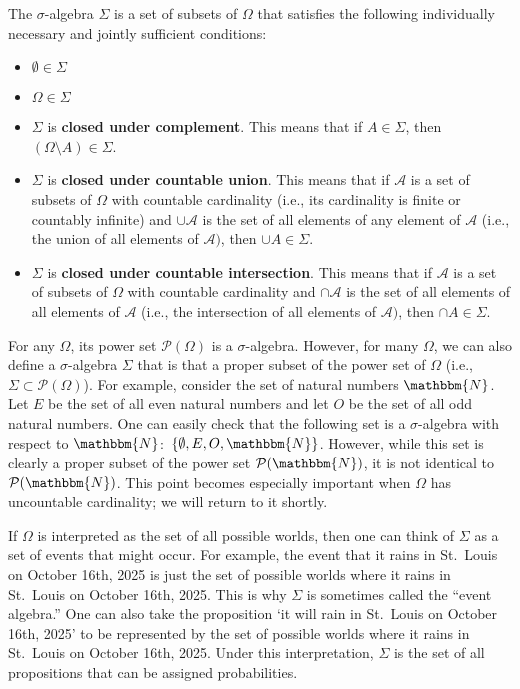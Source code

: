 \documentclass[11pt]{article}
\theoremstyle{definition}
\theoremstyle{remark}
\begin{document}
The $\sigma$-algebra $\Sigma$ is a set of subsets of $\Omega$ that satisfies the following individually necessary and jointly sufficient conditions:
\begin{itemize}
    \item $\emptyset\in\Sigma$

    \item $\Omega\in\Sigma$

    \item $\Sigma$ is \textbf{closed under complement}. This means that if $A\in \Sigma$, then $(\Omega\setminus A)\in \Sigma$.

    \item $\Sigma$ is \textbf{closed under countable union}. This means that if $\mathcal{A}$ is a set of subsets of $\Omega$ with countable cardinality (i.e., its cardinality is finite or countably infinite) and $\cup\mathcal{A}$ is the set of all elements of any element of $\mathcal{A}$ (i.e., the union of all elements of $\mathcal{A})$, then $\cup A\in \Sigma$.

    \item $\Sigma$ is \textbf{closed under countable intersection}. This means that if $\mathcal{A}$ is a set of subsets of $\Omega$ with countable cardinality  and $\cap\mathcal{A}$ is the set of all elements of all elements of $\mathcal{A}$ (i.e., the intersection of all elements of $\mathcal{A})$, then $\cap A\in \Sigma$.
\end{itemize}
For any $\Omega$, its power set $\mathcal{P}(\Omega)$ is a $\sigma$-algebra. However, for many $\Omega$, we can also define a $\sigma$-algebra $\Sigma$ that is that a proper subset of the power set of $\Omega$ (i.e., $\Sigma\subset\mathcal{P}(\Omega)$). For example, consider the set of natural numbers $\mathbbm{N}$. Let $E$ be the set of all even natural numbers and let $O$ be the set of all odd natural numbers. One can easily check that the following set is a $\sigma$-algebra with respect to $\mathbbm{N}$:\ $\{\emptyset,E,O,\mathbbm{N}\}$. However, while this set is clearly a proper subset of the power set $\mathcal{P}(\mathbbm{N})$, it is not identical to $\mathcal{P}(\mathbbm{N})$. This point becomes especially important when $\Omega$ has uncountable cardinality; we will return to it shortly.\par 

If $\Omega$ is interpreted as the set of all possible worlds, then one can think of $\Sigma$ as a set of events that might occur. For example, the event that it rains in St.\ Louis on October 16th, 2025 is just the set of possible worlds where it rains in St.\ Louis on October 16th, 2025. This is why $\Sigma$ is sometimes called the ``event algebra.'' One can also take the proposition `it will rain in St.\ Louis on October 16th, 2025' to be represented by the set of possible worlds where it rains in St.\ Louis on October 16th, 2025. Under this interpretation, $\Sigma$ is the set of all propositions that can be assigned probabilities.\par
\end{document}
